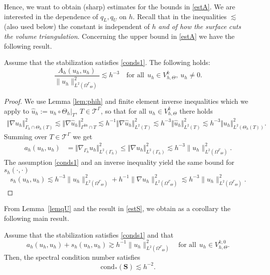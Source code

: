 \documentclass[final]{siamltex}
\begin{document}
 Hence, we want to obtain (sharp) estimates for the bounds in \eqref{estA}. We are interested in the dependence of $q_L,q_U$ on $h$. Recall that in the inequalities $\lesssim$ (also used below) the constant is independent of $h$ \emph{and of how the surface cuts the volume triangulation}. Concerning the upper bound in \eqref{estA} we have the following result.
\begin{lemma} \label{lemqU}
 Assume that the stabilization satisfies \eqref{conds1}. The following holds:
\begin{equation} \label{b1}
 \frac{A_h(u_h,u_h)}{\|u_h\|_{L^2({\Omega^{\Gamma}}_\Theta)}^2} \lesssim h^{-3} \quad \text{for all}~~u_h \in {V_{h,\Theta}^k}, ~u_h \neq 0.
\end{equation}
\end{lemma}
\begin{proof}
We use Lemma \ref{lem:phih} and finite element inverse inequalities which we apply to $\hat{u}_h := u_h \circ \Theta_h |_T$, $T \in {\mathcal{T}}^\Gamma$, so that for all $u_h \in {V_{h,\Theta}^k}$ there holds
\begin{align*}
  \Vert \nabla u_h \Vert_{\Gamma_h \cap \Theta_h(T)}^2 \!
\lesssim \!
  \Vert \nabla \hat{u}_h \Vert_{{\Gamma^{\text{lin}}} \cap T}^2 \!
\lesssim \!
h^{-1} \Vert \nabla \hat{u}_h \Vert_{L^2(T)}^2 \!
\lesssim \!
h^{-3} \Vert \hat{u}_h \Vert_{L^2(T)}^2 \!
\lesssim \!
h^{-3} \Vert u_h \Vert_{L^2(\Theta_h(T))}^2.
\end{align*}
Summing over $T \in {\mathcal{T}}^\Gamma$ we get
\begin{align*}
 a_h(u_h,u_h) & = \Vert \nabla_{\Gamma_h} u_h \Vert_{L^2(\Gamma_h)}^2 \leq \Vert \nabla u_h \Vert_{L^2(\Gamma_h)}^2 \lesssim h^{-3} \| u_h\|_{L^2({\Omega^{\Gamma}}_\Theta)}^2. 
\end{align*}
The assumption \eqref{conds1} and an inverse inequality yield the same bound for $s_h(\cdot,\cdot)$
\[
 s_h(u_h,u_h) \lesssim h^{-3} \|u_h\|_{L^2({\Omega^{\Gamma}}_\Theta)}^2 + h^{-1} \|\nabla u_h\|_{L^2({\Omega^{\Gamma}}_\Theta)}^2 \lesssim h^{-3} \|u_h\|_{L^2({\Omega^{\Gamma}}_\Theta)}^2.
\]
\end{proof}

From Lemma~\ref{lemqU} and the result in \eqref{estS}, we obtain as a corollary the following main result.
\begin{theorem}\label{coro:condition-number}
Assume that the stabilization satisfies \eqref{conds1} and that
\begin{equation}
a_h(u_h,u_h) + s_h(u_h,u_h) \gtrsim h^{-1} \| u_h\|_{L^2({\Omega^{\Gamma}}_\Theta)}^2 \quad \text{for all}~~u_h \in {V_{h,\Theta}^{k,0}}. \label{conds3}
\end{equation}
Then, the spectral condition number satisfies
\begin{equation} \label{condbound}
 \operatorname{cond_\ast}({\mathbf S}) \lesssim h^{-2}.
\end{equation}
\end{theorem}
\end{document}
